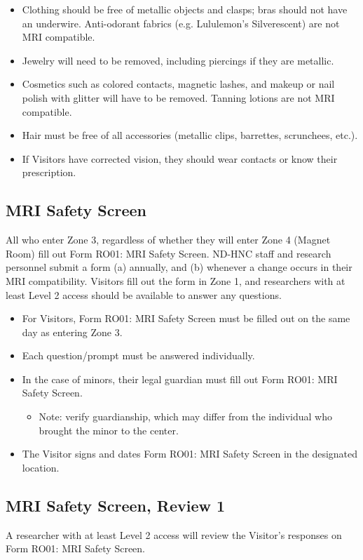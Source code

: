 \documentclass[11pt]{article}
\begin{document}
\begin{itemize}
    \item Clothing should be free of metallic objects and clasps; bras should not have an underwire. Anti-odorant fabrics (e.g. Lululemon's Silverescent) are not MRI compatible.
    \item Jewelry will need to be removed, including piercings if they are metallic.
    \item Cosmetics such as colored contacts, magnetic lashes, and makeup or nail polish with glitter will have to be removed. Tanning lotions are not MRI compatible.
    \item Hair must be free of all accessories (metallic clips, barrettes, scrunchees, etc.).
    \item If Visitors have corrected vision, they should wear contacts or know their prescription.
\end{itemize}

%
\subsection{MRI Safety Screen}
\label{ssec:mri-safety}
All who enter Zone 3, regardless of whether they will enter Zone 4 (Magnet Room) fill out Form RO01: MRI Safety Screen. ND-HNC staff and research personnel submit a form (a) annually, and (b) whenever a change occurs in their MRI compatibility. Visitors fill out the form in Zone 1, and researchers with at least Level 2 access should be available to answer any questions.

\begin{itemize}
    \item For Visitors, Form RO01: MRI Safety Screen must be filled out on the same day as entering Zone 3.
    \item Each question/prompt must be answered individually.
    \item In the case of minors, their legal guardian must fill out Form RO01: MRI Safety Screen.
    \begin{itemize}
        \item Note: verify guardianship, which may differ from the individual who brought the minor to the center.
    \end{itemize}
    \item The Visitor signs and dates Form RO01: MRI Safety Screen in the designated location.
\end{itemize}


\subsection{MRI Safety Screen, Review 1}
\label{ssec:mri-rev1}
A researcher with at least Level 2 access will review the Visitor's responses on Form RO01: MRI Safety Screen.
\end{document}
